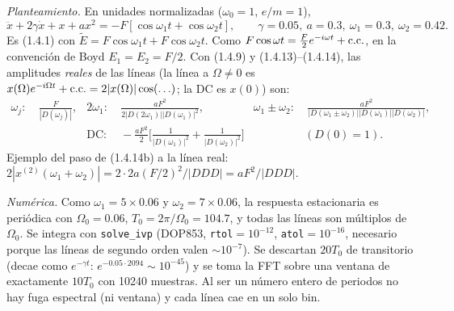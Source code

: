 \emph{Planteamiento.} En unidades normalizadas ($\omega_0=1$, $e/m=1$),
\[
\ddot x+2\gamma\dot x+x+ax^2=-F[\cos\omega_1t+\cos\omega_2t],\qquad \gamma=0.05,\ a=0.3,\ \omega_1=0.3,\ \omega_2=0.42.
\]
Es (1.4.1) con $\tilde E=F\cos\omega_1t+F\cos\omega_2t$. Como $F\cos\omega t=\tfrac F2e^{-i\omega t}+\text{c.c.}$, en la convención de Boyd $E_1=E_2=F/2$. Con (1.4.9) y (1.4.13)--(1.4.14), las amplitudes \emph{reales} de las líneas (la línea a $\Omega\neq0$ es $x(\Omega)e^{-i\Omega t}+\text{c.c.}=2|x(\Omega)|\cos(\ldots)$; la DC es $x(0)$) son:
\begin{align*}
\omega_j:&\ \frac{F}{|D(\omega_j)|}, & 2\omega_1:&\ \frac{aF^2}{2|D(2\omega_1)||D(\omega_1)|^2}, & \omega_1\pm\omega_2:&\ \frac{aF^2}{|D(\omega_1\pm\omega_2)||D(\omega_1)||D(\omega_2)|},\\
&& \text{DC}:&\ -\frac{aF^2}{2}\Big[\frac{1}{|D(\omega_1)|^2}+\frac{1}{|D(\omega_2)|^2}\Big] &&(D(0)=1).
\end{align*}
Ejemplo del paso de (1.4.14b) a la línea real: $2|x^{(2)}(\omega_1+\omega_2)|=2\cdot2a(F/2)^2/|DDD|=aF^2/|DDD|$.

\emph{Numérica.} Como $\omega_1=5\times0.06$ y $\omega_2=7\times0.06$, la respuesta estacionaria es periódica con $\Omega_0=0.06$, $T_0=2\pi/\Omega_0=104.7$, y todas las líneas son múltiplos de $\Omega_0$. Se integra con \texttt{solve\_ivp} (DOP853, \texttt{rtol}$=10^{-12}$, \texttt{atol}$=10^{-16}$, necesario porque las líneas de segundo orden valen $\sim10^{-7}$). Se descartan $20T_0$ de transitorio (decae como $e^{-\gamma t}$: $e^{-0.05\cdot2094}\sim10^{-45}$) y se toma la FFT sobre una ventana de exactamente $10T_0$ con 10240 muestras. Al ser un número entero de periodos no hay fuga espectral (ni ventana) y cada línea cae en un solo bin.

